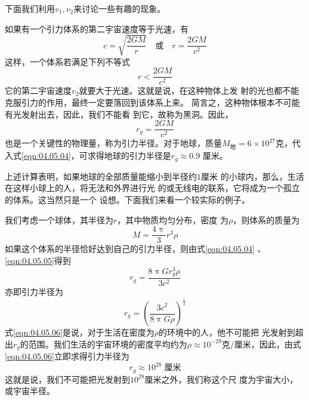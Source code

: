 下面我们利用$  v _ 1 , v _ 2 $来讨论一些有趣的现象。

如果有一个引力体系的第二宇宙速度等于光速，有
\begin{equation*}
  c = \sqrt { \frac { 2 G M } { r } } \quad
  \text{或} \quad
  r = \frac { 2 G M } { c ^ { 2 } }
\end{equation*}
这样，一个体系若满足下列不等式
\begin{equation*}
  r < \frac { 2 G M } { c ^ { 2 } }
\end{equation*}
它的第二宇宙速度$ v_2 $就要大于光速。这就是说，在这种物体上发
射的光也都不能克服引力的作用，最终一定要落回到该体系上来。
简言之，这种物体根本不可能有光发射出去，因此，我们不能看
到它，故称为黑洞。因此，
\begin{equation}\label{eqn:04.05.04}
  r _ { g } = \frac { 2 G M } { c ^ { 2 } }
\end{equation}
也是一个关键性的物理量，称为引力半径。对于地球，质量$ M _ { \text{地} }= 6 \times 1 0 ^ { 2 7 }  $克，代入式\eqref{eqn:04.05.04}，可求得地球的引力半径是$  r _ { g } \approx 0 . 9  $
厘米。

上述计算表明，如果地球的全部质量能缩小到半径约$ 1 $厘米
的小球内，那么，生活在这样小球上的人，将无法和外界进行光
的或无线电的联系，它将成为一个孤立的体系。这当然只是一个
设想。下面我们来看一个较实际的例子。

我们考虑一个球体，其半径为$ r $，其中物质均匀分布，密度
为$ \rho $，则体系的质量为
\begin{equation}\label{eqn:04.05.05}
  M = \frac { 4 \uppi } { 3 } r ^ { 3 } \rho
\end{equation}
如果这个体系的半径恰好达到自己的引力半径，则由式\eqref{eqn:04.05.04} 、\eqref{eqn:04.05.05}得到\vspace{-1.5em}
\begin{equation*}
  r _ { g } = \frac { 8 \uppi G r _ { g } ^ { 3 } \rho } { 3 c ^ { 2 } }
\end{equation*}
亦即引力半径为\vspace{-1.5em}
\begin{equation}\label{eqn:04.05.06}
  r _ { g } = \left( \frac { 3 c ^ { 2 } } { 8 \uppi G \rho } \right) ^ { \frac { 1 } { 2 } }
\end{equation}
式\eqref{eqn:04.05.06}是说，对于生活在密度为$ \rho $的环境中的人，他不可能把
光发射到超出$ r_g $的范围。我们生活的宇宙环境的密度平均约为$ \rho
  \approx 10 ^ {-29}$克/厘米，因此，由式\eqref{eqn:04.05.06}立即求得引力半径为
\begin{equation*}
  r _ g \approx 10 ^ {28}\;\text{厘米}
\end{equation*}
这就是说，我们不可能把光发射到$ 10 ^ {28} $厘米之外，我们称这个尺
度为宇宙大小，或宇宙半径。